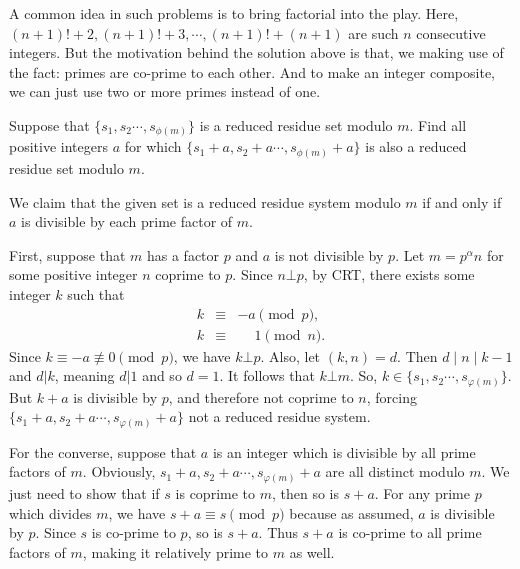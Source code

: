 \documentclass{subfile}
\begin{document}
		\begin{note}
			A common idea in such problems is to bring factorial into the play. Here, $(n+1)!+2,(n+1)!+3,\cdots,(n+1)!+(n+1)$ are such $n$ consecutive integers. But the motivation behind the solution above is that, we making use of the fact: primes are co-prime to each other. And to make an integer composite, we can just use two or more primes instead of one.
		\end{note}
		
		\begin{problem}
			Suppose that $ \{s_1,s_2\cdots , s_{\phi(m)}\} $ is a reduced residue set modulo $m$. Find all positive integers $a$ for which $ \{s_1+a,s_2+a\cdots , s_{\phi(m)}+a\} $ is also a reduced residue set modulo $m$.
		\end{problem}
		
		\begin{solution}
			We claim that the given set is a reduced residue system modulo $m$ if and only if $a$ is divisible by each prime factor of $m$. 
			
			First, suppose that $m$ has a factor $p$ and $a$ is not divisible by $p$. Let $m=p^{\alpha}n$ for some positive integer $n$ coprime to $p$. Since $n \bot p$, by CRT, there exists some integer $k$ such that
				\begin{eqnarray*}
				k &\equiv& -a \pmod p,\\
				k &\equiv& \phantom{-}1  \pmod n.
				\end{eqnarray*}
			Since $k \equiv -a \not \equiv 0 \pmod p$, we have $k \bot p$. Also, let $(k,n)=d$. Then $d\mid n\mid k-1$ and $d|k$, meaning $d|1$ and so $d=1$. It follows that $k \bot m$. So, $k \in \{s_1,s_2\cdots , s_{\varphi(m)}\} $. But $k+a$ is divisible by $p$, and therefore not coprime to $n$, forcing $ \{s_1+a,s_2+a\cdots , s_{\varphi(m)}+a\} $ not a reduced residue system.
			
			For the converse, suppose that $a$ is an integer which is divisible by all prime factors of $m$. Obviously, $s_1+a,s_2+a\cdots , s_{\varphi(m)}+a$ are all distinct modulo $m$. We just need to show that if $s$ is coprime to $m$, then so is $s+a$. For any prime $p$ which divides $m$, we have $s+a \equiv s \pmod p$ because as assumed, $a$ is divisible by $p$. Since $s$ is co-prime to $p$, so is $s+a$. Thus $s+a$ is co-prime to all prime factors of $m$, making it relatively prime to $m$ as well. 
		\end{solution}
		
\end{document}
